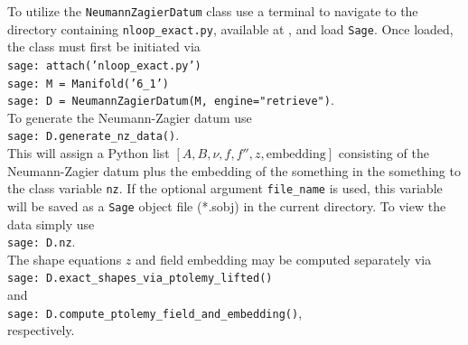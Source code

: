 \documentclass[12pt]{amsart}
\theoremstyle{definition}
\begin{document}
To utilize the \texttt{NeumannZagierDatum} class use a terminal to navigate to
the directory containing \texttt{nloop\_exact.py}, available at 
\cite{nloop-compute}, and load \texttt{Sage}. Once loaded, the class must 
first be initiated via\\
\indent \texttt{sage: attach('nloop\_exact.py')\\
\indent	     sage: M = Manifold('6\_1')\\
\indent	     sage: D = NeumannZagierDatum(M, engine="retrieve")}.\\
To generate the Neumann-Zagier datum use\\
\indent \texttt{sage: D.generate\_nz\_data()}.\\
This will assign a Python list $[A,B,\nu,f,f'',z, \text{embedding}]$ 
consisting of
the Neumann-Zagier datum plus the embedding of the something in the
something to the class variable \texttt{nz}. If the optional argument
\texttt{file\_name} is used, this variable will be saved as a \texttt{Sage} 
object
file (*.sobj) in the current directory. To view the data simply use\\
\indent \texttt{sage: D.nz}.\\
The shape equations $z$ and field embedding may be computed separately
via\\
\indent \texttt{sage: D.exact\_shapes\_via\_ptolemy\_lifted()}\\
and\\
\indent \texttt{sage: D.compute\_ptolemy\_field\_and\_embedding()},\\
respectively.
\end{document}

